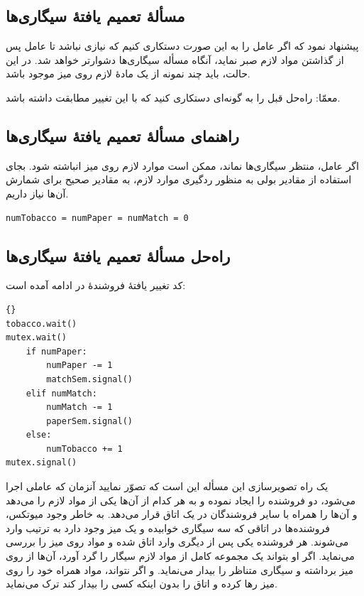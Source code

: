 \documentclass{book}
\newcommand{\clearemptydoublepage}{}%
\begin{document}

\subsection{ مسألهٔ تعمیم یافتهٔ سیگاری‌ها}

     پیشنهاد نمود که اگر عامل را به این صورت دستکاری کنیم
     که نیازی نباشد تا عامل پس از گذاشتن مواد لازم صبر نماید، آنگاه مسأله سیگاری‌ها دشوارتر خواهد شد. 
    در این حالت، باید چند نمونه از یک مادهٔ لازم روی میز موجود باشد. 

    معمّا: راه‌حل قبل را به گونه‌ای دستکاری کنید که با این تغییر مطابقت داشته باشد. 

\clearemptydoublepage
\subsection{راهنمای مسألهٔ تعمیم یافتهٔ سیگاری‌ها}

    اگر عامل، منتظر سیگاری‌ها نماند، ممکن است موارد لازم روی میز انباشته شود. بجای استفاده از مقادیر بولی به منظور ردگیری موارد لازم، 
    به مقادیر صحیح برای شمارش آن‌ها نیاز داریم. 

\begin{latin}
\begin{lstlisting}[title=\rl{راهنمای  مسألهٔ تعمیم یافتهٔ سیگاری‌ها}]
numTobacco = numPaper = numMatch = 0
\end{lstlisting}
\end{latin}


\clearemptydoublepage
\subsection{راه‌حل مسألهٔ تعمیم یافتهٔ سیگاری‌ها}
\label{smoker}

    کد تغییر یافتهٔ فروشندهٔ  در ادامه آمده است: 

\begin{latin}
\begin{lstlisting}[title={\rl{فروشنده} A}]{}
tobacco.wait()
mutex.wait()
    if numPaper:
        numPaper -= 1
        matchSem.signal()
    elif numMatch:
        numMatch -= 1
        paperSem.signal()
    else: 
        numTobacco += 1
mutex.signal()
\end{lstlisting}
\end{latin}

    یک راه تصویرسازی این مسأله این است که تصوّر نمایید آنزمان که عاملی اجرا می‌شود‌، دو فروشنده را ایجاد نموده و به هر کدام از آن‌ها یکی از مواد لازم را 
    می‌دهد و آن‌ها را همراه با سایر فروشندگان در یک اتاق قرار می‌دهد. به خاطر وجود میوتکس، فروشنده‌ها در اتاقی که سه سیگاری خوابیده و یک میز وجود دارد 
    به ترتیب وارد می‌شوند. هر فروشنده یکی پس از دیگری وارد اتاق شده و مواد روی میز را بررسی می‌نماید. اگر او بتواند یک مجموعه کامل از مواد لازم سیگار را
    گرد آورد، آن‌ها از روی میز برداشته و سیگاری متناظر را بیدار می‌نماید. و اگر نتواند،‌ مواد همراه خود را روی میز رها کرده و اتاق را بدون اینکه کسی را 
    بیدار کند ترک می‌نماید. 
\end{document}
